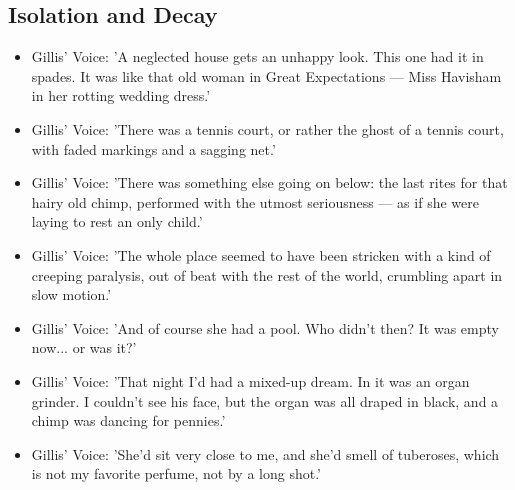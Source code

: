 \documentclass[a4paper]{article}
\begin{document}
\subsection{Isolation and Decay}
\begin{itemize}
  \item Gillis' Voice: 'A neglected house gets an unhappy look. This one had it in spades. It was like that old woman in Great Expectations — Miss Havisham in her rotting wedding dress.'
  \item Gillis' Voice: 'There was a tennis court, or rather the ghost of a tennis court, with faded markings and a sagging net.'
  \item Gillis' Voice: 'There was something else going on below: the last rites for that hairy old chimp, performed with the utmost seriousness — as if she were laying to rest an only child.'
  \item Gillis' Voice: 'The whole place seemed to have been stricken with a kind of creeping paralysis, out of beat with the rest of the world, crumbling apart in slow motion.'
  \item Gillis' Voice: 'And of course she had a pool. Who didn't then? It was empty now... or was it?'
  \item Gillis' Voice: 'That night I'd had a mixed-up dream. In it was an organ grinder. I couldn't see his face, but the organ was all draped in black, and a chimp was dancing for pennies.'
  \item Gillis' Voice: 'She'd sit very close to me, and she'd smell of tuberoses, which is not my favorite perfume, not by a long shot.'\\
\end{itemize}
\end{document}
